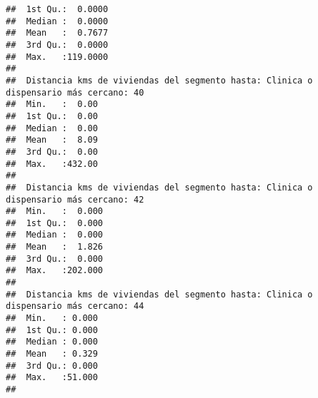 \documentclass[11pt,]{article}
\begin{document}
\begin{verbatim}
##  1st Qu.:  0.0000                                                                    
##  Median :  0.0000                                                                    
##  Mean   :  0.7677                                                                    
##  3rd Qu.:  0.0000                                                                    
##  Max.   :119.0000                                                                    
##                                                                                      
##  Distancia kms de viviendas del segmento hasta: Clinica o dispensario más cercano: 40
##  Min.   :  0.00                                                                      
##  1st Qu.:  0.00                                                                      
##  Median :  0.00                                                                      
##  Mean   :  8.09                                                                      
##  3rd Qu.:  0.00                                                                      
##  Max.   :432.00                                                                      
##                                                                                      
##  Distancia kms de viviendas del segmento hasta: Clinica o dispensario más cercano: 42
##  Min.   :  0.000                                                                     
##  1st Qu.:  0.000                                                                     
##  Median :  0.000                                                                     
##  Mean   :  1.826                                                                     
##  3rd Qu.:  0.000                                                                     
##  Max.   :202.000                                                                     
##                                                                                      
##  Distancia kms de viviendas del segmento hasta: Clinica o dispensario más cercano: 44
##  Min.   : 0.000                                                                      
##  1st Qu.: 0.000                                                                      
##  Median : 0.000                                                                      
##  Mean   : 0.329                                                                      
##  3rd Qu.: 0.000                                                                      
##  Max.   :51.000                                                                      
##                                                                                      

\end{verbatim}
\end{document}
